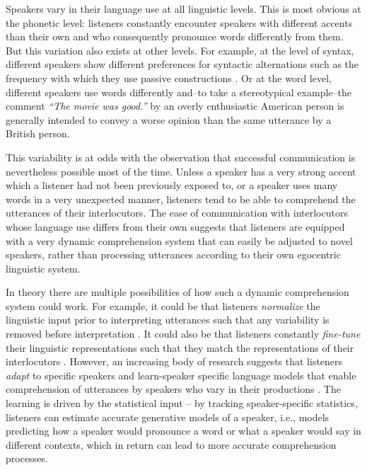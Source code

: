 Speakers vary in their language use at all linguistic levels. This is most obvious at the phonetic level: listeners constantly encounter speakers with different accents than their own and who consequently pronounce words differently from them. But this variation also exists at other levels. For example, at the level of syntax, different speakers show different preferences for syntactic alternations such as the frequency with which they use passive constructions \cite{Weiner1983}. Or at the word level, different speakers use words differently and--to take a stereotypical example--the comment \textit{``The movie was good.''} by an overly enthusiastic American person is generally intended to convey a worse opinion than the same utterance by a British person.

This variability is at odds with the observation that successful communication is nevertheless possible most of the time. Unless a speaker has a very strong accent which a listener had not been previously exposed to, or a speaker uses many words in a very unexpected manner, listeners tend to be able to comprehend the utterances of their interlocutors. The ease of communication with interlocutors whose language use differs from their own suggests that listeners are equipped with a very dynamic comprehension system that can easily be adjusted to novel speakers, rather than processing utterances according to their own egocentric linguistic system.

In theory there are multiple possibilities of how such a dynamic comprehension system could work. For example, it could be that listeners \textit{normalize} the linguistic input prior to interpreting utterances such that any variability is removed before interpretation . It could also be that listeners constantly \textit{fine-tune} their linguistic representations such that they match the representations of their interlocutors . However, an increasing body of research suggests that listeners \textit{adapt} to specific speakers and learn-speaker specific language models that enable comprehension of utterances by speakers who vary in their productions \cite{Norris2003,Kraljic2007,Bradlow2008, Kamide2012,Kleinschmidt2015,Fine2016,Roettger2019}. The learning is driven by the statistical input -- by tracking speaker-specific statistics, listeners can estimate accurate generative models of a speaker, i.e., models predicting how a speaker would pronounce a word or what a speaker would say in different contexts, which in return can lead to more accurate comprehension processes.


